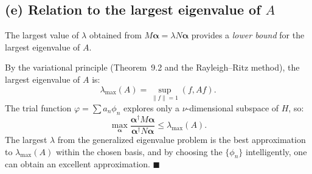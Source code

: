 \documentclass[12pt]{article}
\begin{document}
\subsection*{(e) Relation to the largest eigenvalue of $A$}

The largest value of $\lambda$ obtained from $M\boldsymbol{\alpha} = \lambda N\boldsymbol{\alpha}$ provides a \emph{lower bound} for the largest eigenvalue of $A$.

By the variational principle (Theorem~9.2 and the Rayleigh--Ritz method), the largest eigenvalue of $A$ is:
\[
\lambda_{\max}(A) = \sup_{\|f\|=1} (f, Af).
\]
The trial function $\varphi = \sum a_n \phi_n$ explores only a $\nu$-dimensional subspace of $H$, so:
\[
\max_{\boldsymbol{\alpha}} \frac{\boldsymbol{\alpha}^\dagger M \boldsymbol{\alpha}}{\boldsymbol{\alpha}^\dagger N \boldsymbol{\alpha}} \le \lambda_{\max}(A).
\]
The largest $\lambda$ from the generalized eigenvalue problem is the best approximation to $\lambda_{\max}(A)$ within the chosen basis, and by choosing the $\{\phi_n\}$ intelligently, one can obtain an excellent approximation. \hfill $\blacksquare$
\end{document}
